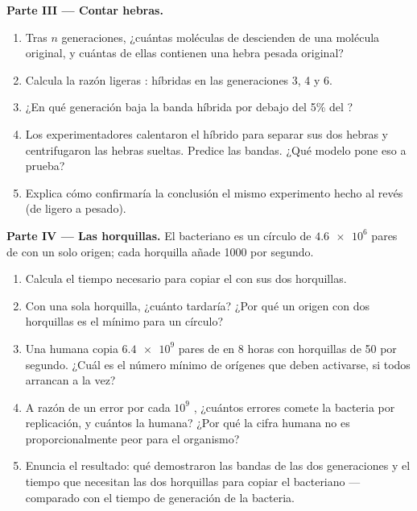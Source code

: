 \begin{problem}
\medskip
\noindent\textbf{Parte III --- Contar hebras.}
\begin{enumerate}[resume]
  \item Tras $n$ generaciones, ¿cuántas moléculas de  descienden de
        una molécula original, y cuántas de ellas contienen una hebra
        pesada original?
  \item Calcula la razón ligeras : híbridas en las generaciones 3, 4 y
        6.
  \item ¿En qué generación baja la banda híbrida por debajo del 5\% del
        ?
  \item Los experimentadores calentaron el  híbrido para separar sus
        dos hebras y centrifugaron las hebras sueltas. Predice las
        bandas. ¿Qué modelo pone eso a prueba?
  \item Explica cómo confirmaría la conclusión el mismo experimento
        hecho al revés (de ligero a pesado).
\end{enumerate}

\medskip
\noindent\textbf{Parte IV --- Las horquillas.}
El  bacteriano es un círculo de $\num{4.6e6}$ pares de 
con un solo origen; cada horquilla añade 1000  por segundo.
\begin{enumerate}[resume]
  \item Calcula el tiempo necesario para copiar el  con sus
        dos horquillas.
  \item Con una sola horquilla, ¿cuánto tardaría? ¿Por qué un origen
        con dos horquillas es el mínimo para un círculo?
  \item Una  humana copia $\num{6.4e9}$ pares de  en 8 horas
        con horquillas de 50  por segundo. ¿Cuál es el
        número mínimo de orígenes que deben activarse, si todos
        arrancan a la vez?
  \item A razón de un error por cada $10^9$ , ¿cuántos
        errores comete la bacteria por replicación, y cuántos la 
        humana? ¿Por qué la cifra humana no es proporcionalmente peor
        para el organismo?
  \item Enuncia el resultado: qué demostraron las bandas de las dos
        generaciones y el tiempo que necesitan las dos horquillas para
        copiar el  bacteriano --- comparado con el tiempo de
        generación de la bacteria.
\end{enumerate}
\end{problem}
